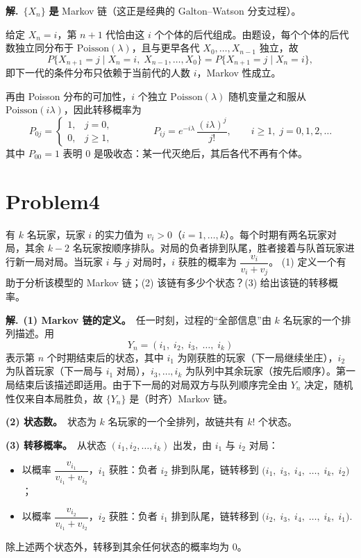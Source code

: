 \documentclass[12pt,a4paper]{article}
\begin{document}
\begin{answerbox}
\textbf{解.}\ $\{X_n\}$ \textbf{是} Markov 链（这正是经典的 Galton--Watson 分支过程）。

给定 $X_n=i$，第 $n+1$ 代恰由这 $i$ 个个体的后代组成。由题设，每个个体的后代数独立同分布于 $\mathrm{Poisson}(\lambda)$，且与更早各代 $X_0,\ldots,X_{n-1}$ 独立，故
\[
P\{X_{n+1}=j \mid X_n=i,\; X_{n-1},\ldots,X_0\}
= P\{X_{n+1}=j \mid X_n=i\},
\]
即下一代的条件分布只依赖于当前代的人数 $i$，Markov 性成立。

再由 Poisson 分布的可加性，$i$ 个独立 $\mathrm{Poisson}(\lambda)$ 随机变量之和服从 $\mathrm{Poisson}(i\lambda)$，因此转移概率为
\[
P_{0j}=
\begin{cases}
1, & j=0,\\
0, & j\ge 1,
\end{cases}
\qquad\qquad
P_{ij}=e^{-i\lambda}\,\frac{(i\lambda)^j}{j!},
\qquad i\ge 1,\; j=0,1,2,\ldots
\]
其中 $P_{00}=1$ 表明 $0$ 是吸收态：某一代灭绝后，其后各代不再有个体。
\end{answerbox}

\section{Problem4}

有 $k$ 名玩家，玩家 $i$ 的实力值为 $v_i>0$（$i=1,\ldots,k$）。每个时期有两名玩家对局，其余 $k-2$ 名玩家按顺序排队。对局的负者排到队尾，胜者接着与队首玩家进行新一局对局。当玩家 $i$ 与 $j$ 对局时，$i$ 获胜的概率为 $\dfrac{v_i}{v_i+v_j}$。
(1) 定义一个有助于分析该模型的 Markov 链；(2) 该链有多少个状态？(3) 给出该链的转移概率。


\begin{answerbox}
\textbf{解.}\ \textbf{(1) Markov 链的定义。}\ 任一时刻，过程的“全部信息”由 $k$ 名玩家的一个排列描述。用
\[
Y_n=(i_1,\; i_2,\; i_3,\;\ldots,\; i_k)
\]
表示第 $n$ 个时期结束后的状态，其中 $i_1$ 为刚获胜的玩家（下一局继续坐庄），$i_2$ 为队首玩家（下一局与 $i_1$ 对局），$i_3,\ldots,i_k$ 为队列中其余玩家（按先后顺序）。第一局结束后该描述即适用。由于下一局的对局双方与队列顺序完全由 $Y_n$ 决定，随机性仅来自本局胜负，故 $\{Y_n\}$ 是（时齐）Markov 链。

\textbf{(2) 状态数。}\ 状态为 $k$ 名玩家的一个全排列，故链共有 $k!$ 个状态。

\textbf{(3) 转移概率。}\ 从状态 $(i_1,i_2,\ldots,i_k)$ 出发，由 $i_1$ 与 $i_2$ 对局：
\begin{itemize}[leftmargin=2em, itemsep=2pt]
  \item 以概率 $\dfrac{v_{i_1}}{v_{i_1}+v_{i_2}}$，$i_1$ 获胜：负者 $i_2$ 排到队尾，链转移到
        $\bigl(i_1,\; i_3,\; i_4,\;\ldots,\; i_k,\; i_2\bigr)$；
  \item 以概率 $\dfrac{v_{i_2}}{v_{i_1}+v_{i_2}}$，$i_2$ 获胜：负者 $i_1$ 排到队尾，链转移到
        $\bigl(i_2,\; i_3,\; i_4,\;\ldots,\; i_k,\; i_1\bigr)$.
\end{itemize}
除上述两个状态外，转移到其余任何状态的概率均为 $0$。
\end{answerbox}
\end{document}
